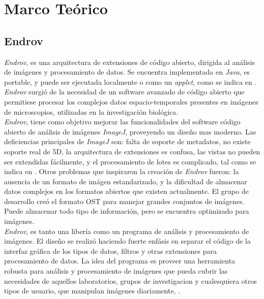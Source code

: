 \thispagestyle{empty}
\cleardoublepage
\chapter{Marco Te\'orico}
\label{sec:dev}
\section{Endrov}
\label{sec:endrov}

\emph{Endrov}, es una arquitectura de extensiones de c\'odigo abierto,
dirigida al an\'alisis de im\'agenes y procesamiento de datos.
Se encuentra implementada en \emph{Java}, es portable, y puede ser ejecutada localmente o como 
un \emph{applet}, como se indica en \cite{web:endrov}. \emph{Endrov} surgi\'o
de la necesidad de un software avanzado de c\'odigo abierto que permitiese procesar 
los complejos datos espacio-temporales presentes en im\'agenes de microscopios, 
utilizadas en la investigaci\'on biol\'ogica.\\

\emph{Endrov}, tiene como objetivo mejorar las funcionalidades del software c\'odigo abierto
de an\'alisis de im\'agenes \emph{ImageJ}, proveyendo un dise\~no mas moderno. 
Las deficiencias principales de \emph{ImageJ} son: falta de soporte de metadatos,
no existe soporte real de 5D, la arquitectura de extensiones es confusa, las vistas
no pueden ser extendidas fácilmente, y el procesamiento de lotes es complicado, 
tal como se indica en \cite{web:endrovhome}.
Otros problemas que inspiraron la creaci\'on de \emph{Endrov} fueron: la ausencia de un 
formato de im\'agen estandarizado, y la dificultad
de almacenar datos complejos en los formatos abiertos que existen actualmente.
El grupo de desarrollo cre\'o el formato OST para manejar grandes conjuntos de im\'agenes.
Puede almacenar todo tipo de informaci\'on, pero se encuentra optimizado para im\'agenes.\\

\emph{Endrov}, es tanto una liber\'ia como un programa de an\'alisis y procesamiento de 
im\'agenes. El dise\~no se realiz\'o haciendo fuerte enf\'asis en separar el c\'odigo
de la interfaz gr\'afica de los tipos de datos, filtros y otras extensiones para 
procesamiento de datos. La idea del programa es proveer una herramienta robusta para
an\'alisis y procesamiento de im\'agenes que pueda cubrir las necesidades de aquellos
laboratorios, grupos de investigacion y cualesquiera otros tipos de usuario, que 
manipulan im\'agenes diariamente, \cite{web:endrov}.\\

